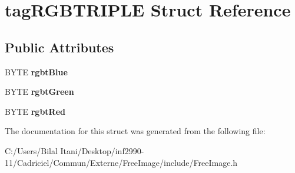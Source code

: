\hypertarget{structtag_r_g_b_t_r_i_p_l_e}{}\section{tag\+R\+G\+B\+T\+R\+I\+P\+LE Struct Reference}
\label{structtag_r_g_b_t_r_i_p_l_e}
\subsection*{Public Attributes}
\begin{DoxyCompactItemize}
\item 
B\+Y\+TE {\bfseries rgbt\+Blue}\hypertarget{structtag_r_g_b_t_r_i_p_l_e_adbebf9e7802cdfffbdae31c08a71dab7}{}\label{structtag_r_g_b_t_r_i_p_l_e_adbebf9e7802cdfffbdae31c08a71dab7}

\item 
B\+Y\+TE {\bfseries rgbt\+Green}\hypertarget{structtag_r_g_b_t_r_i_p_l_e_a2e3e106422819352693de65189cc341f}{}\label{structtag_r_g_b_t_r_i_p_l_e_a2e3e106422819352693de65189cc341f}

\item 
B\+Y\+TE {\bfseries rgbt\+Red}\hypertarget{structtag_r_g_b_t_r_i_p_l_e_ae61b0771fd3e1e267a3495dcfba5e21c}{}\label{structtag_r_g_b_t_r_i_p_l_e_ae61b0771fd3e1e267a3495dcfba5e21c}

\end{DoxyCompactItemize}


The documentation for this struct was generated from the following file\+:\begin{DoxyCompactItemize}
\item 
C\+:/\+Users/\+Bilal Itani/\+Desktop/inf2990-\/11/\+Cadriciel/\+Commun/\+Externe/\+Free\+Image/include/Free\+Image.\+h\end{DoxyCompactItemize}
